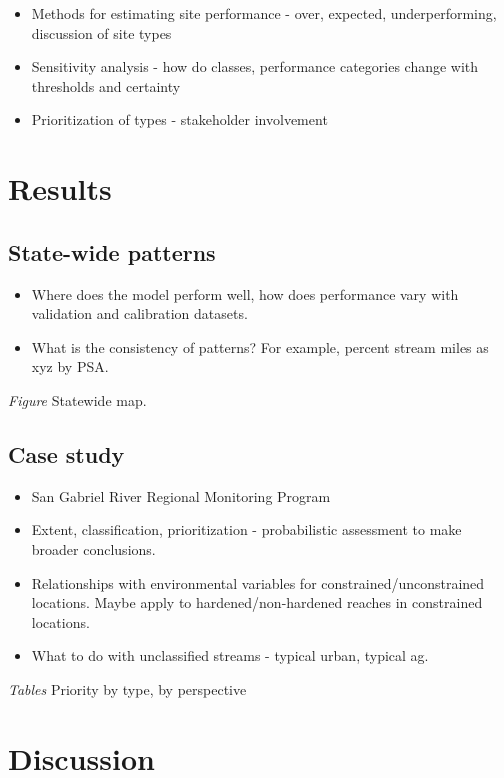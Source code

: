 \documentclass[]{article}
\begin{document}
\begin{itemize}
\item
  Methods for estimating site performance - over, expected,
  underperforming, discussion of site types
\item
  Sensitivity analysis - how do classes, performance categories change
  with thresholds and certainty
\item
  Prioritization of types - stakeholder involvement
\end{itemize}

\section{Results}\label{results}

\subsection{State-wide patterns}\label{state-wide-patterns}

\begin{itemize}
\item
  Where does the model perform well, how does performance vary with
  validation and calibration datasets.
\item
  What is the consistency of patterns? For example, percent stream miles
  as xyz by PSA.
\end{itemize}

\emph{Figure} Statewide map.

\subsection{Case study}\label{case-study}

\begin{itemize}
\item
  San Gabriel River Regional Monitoring Program
\item
  Extent, classification, prioritization - probabilistic assessment to
  make broader conclusions.
\item
  Relationships with environmental variables for
  constrained/unconstrained locations. Maybe apply to
  hardened/non-hardened reaches in constrained locations.
\item
  What to do with unclassified streams - typical urban, typical ag.
\end{itemize}

\emph{Tables} Priority by type, by perspective

\section{Discussion}\label{discussion}
\end{document}
